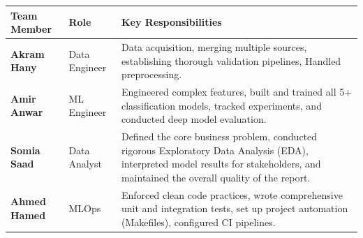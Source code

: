 \documentclass{article}
\begin{document}
\begin{tcolorbox}[mainbox, title={Work Distribution}]
\renewcommand{\arraystretch}{1.5}
\begin{tabularx}{\textwidth}{l l X}
    \toprule
    \textbf{Team Member} & \textbf{Role} & \textbf{Key Responsibilities} \\
    \midrule
    \textbf{Akram Hany} & Data Engineer & Data acquisition, merging multiple sources, establishing thorough validation pipelines, Handled preprocessing. \\
    \textbf{Amir Anwar} & ML Engineer & Engineered complex features, built and trained all 5+ classification models, tracked experiments, and conducted deep model evaluation. \\
    \textbf{Somia Saad} & Data Analyst & Defined the core business problem, conducted rigorous Exploratory Data Analysis (EDA), interpreted model results for stakeholders, and maintained the overall quality of the report. \\
    \textbf{Ahmed Hamed} & MLOps & Enforced clean code practices, wrote comprehensive unit and integration tests, set up project automation (Makefiles), configured CI pipelines. \\
    \bottomrule
\end{tabularx}
\end{tcolorbox}
\end{document}
